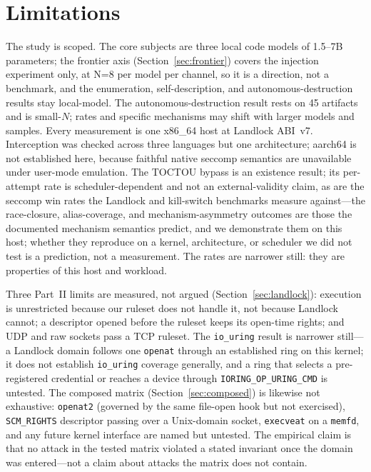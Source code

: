 \documentclass[11pt]{article}
\newcommand{\AutoAtt}{45}
\begin{document}
\section{Limitations}\label{sec:limits}

The study is scoped. The core subjects are three local code models of 1.5--7B parameters; the frontier
axis (Section~\ref{sec:frontier}) covers the injection experiment only, at N=8 per model per channel, so
it is a direction, not a benchmark, and the enumeration, self-description, and autonomous-destruction
results stay local-model. The autonomous-destruction result rests on \AutoAtt{} artifacts and is
small-$N$; rates and specific mechanisms may shift with larger models and samples. Every measurement is
one x86\_64 host at Landlock ABI~v7. Interception was checked across three languages but one architecture;
aarch64 is not established here, because faithful native seccomp semantics are unavailable under user-mode
emulation. The TOCTOU bypass is an existence result; its per-attempt rate is scheduler-dependent and not
an external-validity claim, as are the seccomp win rates the Landlock and kill-switch benchmarks measure
against---the race-closure, alias-coverage, and mechanism-asymmetry outcomes are those the documented
mechanism semantics predict, and we demonstrate them on this host; whether they reproduce on a kernel,
architecture, or scheduler we did not test is a prediction, not a measurement. The rates are narrower
still: they are properties of this host and workload.

Three Part~II limits are measured, not argued (Section~\ref{sec:landlock}): execution is unrestricted
because our ruleset does not handle it, not because Landlock cannot; a descriptor opened before the ruleset
keeps its open-time rights; and UDP and raw sockets pass a TCP ruleset. The \texttt{io\_uring} result is
narrower still---a Landlock domain follows one \texttt{openat} through an established ring on this kernel;
it does not establish \texttt{io\_uring} coverage generally, and a ring that selects a pre-registered
credential or reaches a device through \texttt{IORING\_OP\_URING\_CMD} is untested. The composed matrix
(Section~\ref{sec:composed}) is likewise not exhaustive: \texttt{openat2} (governed by the same file-open
hook but not exercised), \texttt{SCM\_RIGHTS} descriptor passing over a Unix-domain socket,
\texttt{execveat} on a \texttt{memfd}, and any future kernel interface are named but untested. The
empirical claim is that no attack in the tested matrix violated a stated invariant once the domain was
entered---not a claim about attacks the matrix does not contain.
\end{document}
